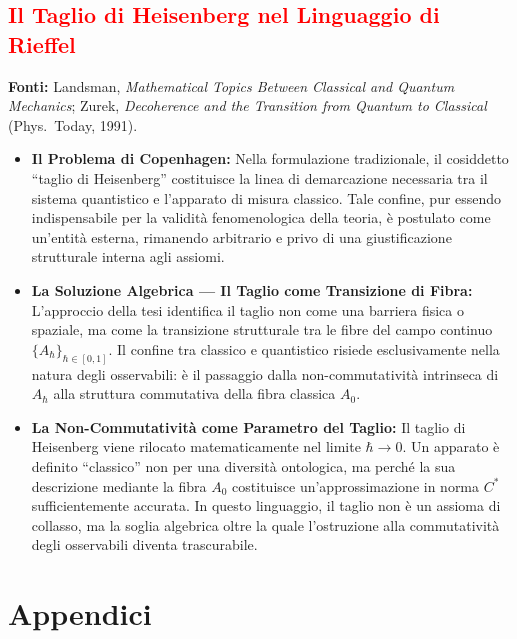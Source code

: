 \documentclass[12pt, a4paper]{article}
\newcommand{\fonti}[1]{%
	\begin{fontebox}
		\textcolor{fontecolor}{\footnotesize\textbf{Fonti:} #1}
	\end{fontebox}%
}
\begin{document}
	\subsection*{\textcolor{red}{Il Taglio di Heisenberg nel Linguaggio di Rieffel}}
	
	\fonti{Landsman, \textit{Mathematical Topics Between Classical and Quantum Mechanics};
		Zurek, \textit{Decoherence and the Transition from Quantum to Classical}
		(Phys.\ Today, 1991).}
	
	\begin{itemize}
		\item \textbf{Il Problema di Copenhagen:} Nella formulazione tradizionale, il cosiddetto ``taglio di Heisenberg'' costituisce la linea di demarcazione necessaria tra il sistema quantistico e l'apparato di misura classico. Tale confine, pur essendo indispensabile per la validità fenomenologica della teoria, è postulato come un'entità esterna, rimanendo arbitrario e privo di una giustificazione strutturale interna agli assiomi.
		
		\item \textbf{La Soluzione Algebrica --- Il Taglio come Transizione di Fibra:} L'approccio della tesi identifica il taglio non come una barriera fisica o spaziale, ma come la transizione strutturale tra le fibre del campo continuo $\{A_\hbar\}_{\hbar \in [0,1]}$. Il confine tra classico e quantistico risiede esclusivamente nella natura degli osservabili: è il passaggio dalla non-commutatività intrinseca di $A_\hbar$ alla struttura commutativa della fibra classica $A_0$.
		
		\item \textbf{La Non-Commutatività come Parametro del Taglio:} Il taglio di Heisenberg viene rilocato matematicamente nel limite $\hbar \to 0$. Un apparato è definito ``classico'' non per una diversità ontologica, ma perché la sua descrizione mediante la fibra $A_0$ costituisce un'approssimazione in norma $C^*$ sufficientemente accurata. In questo linguaggio, il taglio non è un assioma di collasso, ma la soglia algebrica oltre la quale l'ostruzione alla commutatività degli osservabili diventa trascurabile.
	\end{itemize}
	
	\newpage
	\section*{Appendici}
	
\end{document}
